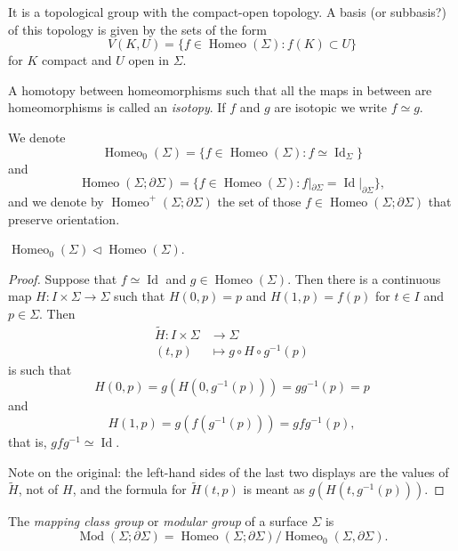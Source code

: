 \begin{remark}
\label{remark-compact-open}
It is a topological group with the
compact-open topology. A basis (or
subbasis?) of this topology is given by
the sets of the form
$$
V(K,U)=\{f\in
\operatorname{Homeo}(\Sigma):
f(K)\subset U\}
$$
for $K$ compact and $U$ open in
$\Sigma$.
\end{remark}

\begin{definition}
\label{definition-isotopy}
A homotopy between homeomorphisms such
that all the maps in between are
homeomorphisms is called an
{\it isotopy}. If $f$ and $g$ are
isotopic we write $f\simeq g$.
\end{definition}

We denote
$$
\operatorname{Homeo}_0(\Sigma)
=\{f\in\operatorname{Homeo}(\Sigma):
f\simeq\operatorname{Id}_\Sigma\}
$$
and
$$
\operatorname{Homeo}
(\Sigma;\partial\Sigma)
=\{f\in\operatorname{Homeo}(\Sigma):
f|_{\partial\Sigma}
=\operatorname{Id}|_{\partial\Sigma}\},
$$
and we denote by
$\operatorname{Homeo}^+
(\Sigma;\partial\Sigma)$
the set of those
$f\in\operatorname{Homeo}
(\Sigma;\partial\Sigma)$
that preserve orientation.

\begin{exercise}[Homework]
\label{exercise-homeo-zero-normal}
$\operatorname{Homeo}_0(\Sigma)
\triangleleft
\operatorname{Homeo}(\Sigma)$.
\end{exercise}

\begin{proof}
Suppose that $f\simeq\operatorname{Id}$
and $g\in\operatorname{Homeo}(\Sigma)$.
Then there is a continuous map
$H:I\times\Sigma\to\Sigma$ such that
$H(0,p)=p$ and $H(1,p)=f(p)$ for
$t\in I$ and $p\in\Sigma$. Then
$$
\begin{aligned}
\tilde{H}:I\times\Sigma&\to\Sigma\\
(t,p)&\mapsto g\circ H\circ g^{-1}(p)
\end{aligned}
$$
is such that
$$
H(0,p)=g(H(0,g^{-1}(p)))
=gg^{-1}(p)=p
$$
and
$$
H(1,p)=g(f(g^{-1}(p)))
=gfg^{-1}(p),
$$
that is,
$gfg^{-1}\simeq\operatorname{Id}$.

Note on the original: the left-hand
sides of the last two displays are the
values of $\tilde{H}$, not of $H$, and
the formula for $\tilde{H}(t,p)$ is
meant as $g(H(t,g^{-1}(p)))$.
\end{proof}

\begin{definition}
\label{definition-mapping-class-group}
The {\it mapping class group} or
{\it modular group} of a surface
$\Sigma$ is
$$
\operatorname{Mod}
(\Sigma;\partial\Sigma)
=\operatorname{Homeo}
(\Sigma;\partial\Sigma)\Big/
\operatorname{Homeo}_0
(\Sigma,\partial\Sigma).
$$
\end{definition}

